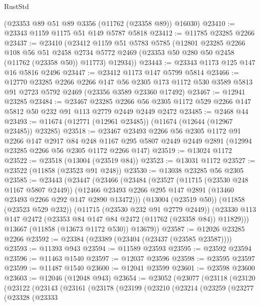 \begin{lexlean}{RustStd}
\begin{coremodule}
    (@23353 @89 @51 @89 @3356 (@11762 (@23358 @89)) @16030)
@23410 := @23343 @1159 @1175 @51 @149 @5787 @5818
@23412 := @11785 @23285 @2266
@23437 := @23410
    (@23412
      @1159
      @51
      @5783
      @5785
      (@12801
        @23285
        @2266
        @108
        @56
        @51
        @2458
        @2734
        @5772
        @2469
        (@23353 @50 @280 @50 @2458 (@11762 (@23358 @50)) @11773)
        @12934))
@23443 := @23343 @1173 @125 @147 @16 @5816 @2496
@23447 := @23412 @1173 @147 @5799 @5814
@23466 := @12770
    @23285
    @2266
    @2266
    @147
    @56
    @2305
    @173
    @1172
    @530
    @3589
    @5813
    @91
    @2723
    @5792
    @2469
    (@23356 @3589 @23360 @17492)
@23467 := @12941 @23285
@23484 := @23467
    @23285
    @2266
    @56
    @2305
    @1172
    @529
    @2266
    @147
    @5812
    @50
    @232
    @91
    @113
    @2779
    @2449
    @2449
    @2472
@23485 := @2468 @44
@23493 := @11674 (@12771 (@12961 @23485)) (@11674 (@12644 (@12967 @23485)) @23285)
@23518 := @23467
    @23493
    @2266
    @56
    @2305
    @1172
    @91
    @2266
    @147
    @2917
    @84
    @248
    @1167
    @295
    @5807
    @2449
    @2449
    @2891
    (@12994 @23285 @2266 @56 @2305 @1172 @2266 @147)
@23519 := @13024 @1172
@23522 := @23518 (@13004 (@23519 @84))
@23523 := @13031 @1172
@23527 := @23522 (@11858 (@23523 @91 @248))
@23530 := @13038 @23285 @56 @2305
@23585 := @23443
    (@23447
      (@23466
        (@23484
          (@23527
            (@11715 (@23530 @248 @1167 @5807 @2449))
            (@12466 @23493 @2266 @295 @147 @2891 (@13460 @23493 @2266 @292 @147 @2890 @13472)))
          (@13004 (@23519 @50))
          (@11858 (@23523 @529 @232))
          (@11715 (@23530 @232 @91 @2779 @2449))
          (@23330 @113 @147 @2472 (@23353 @84 @147 @84 @2472 (@11762 (@23358 @84)) @11829)))
        @13667
        (@11858 (@13673 @1172 @530))
        @13679))
@23587 := @12026 @23285 @2266
@23592 := @23384 (@23389 (@23404 (@23437 (@23585 @23587))))
@23593 := @11393 @943
@23594 := @11589 @23593
@23595 := @23592 @23594
@23596 := @11463 @1540
@23597 := @12037 @23596
@23598 := @23595 @23597
@23599 := @11487 @1540
@23600 := @12041 @23599
@23601 := @23598 @23600
@23603 := @12046 (@12048 @943)
@23654 := @23052
    (@23077
      (@23118
        (@23120
          (@23122
            (@23143
              (@23161
                (@23178
                  (@23199
                    (@23210
                      (@23214
                        (@23259
                          (@23277
                            (@23328
                              (@23333

\end{coremodule}
\end{lexlean}

